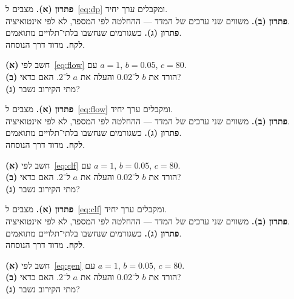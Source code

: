 \begin{keybox}[frametitle={פתרון 12},nobreak=true]
\textbf{פתרון (א).} מצבים ל~\eqref{eq:dp} ומקבלים ערך יחיד.\\[2pt]
\textbf{פתרון (ב).} משווים שני ערכים של המדד — ההחלטה לפי המספר, לא לפי אינטואיציה.\\[2pt]
\textbf{פתרון (ג).} כשגורמים שנחשבו בלתי־תלויים מתואמים.\\[2pt]
\textbf{לקח.} מדוד דרך הנוסחה.
\end{keybox}


\begin{exbox}[frametitle={תרגיל 13 — \en{maxflow}}]
\textbf{(א)} חשב לפי~\eqref{eq:flow} עם $a=1$, $b=0.05$, $c=80$.\\[3pt]
\textbf{(ב)} הורד את $b$ ל־$0.02$ והעלה את $a$ ל־$2$. האם כדאי?\\[3pt]
\textbf{(ג)} מתי הקירוב נשבר?
\end{exbox}

\begin{keybox}[frametitle={פתרון 13},nobreak=true]
\textbf{פתרון (א).} מצבים ל~\eqref{eq:flow} ומקבלים ערך יחיד.\\[2pt]
\textbf{פתרון (ב).} משווים שני ערכים של המדד — ההחלטה לפי המספר, לא לפי אינטואיציה.\\[2pt]
\textbf{פתרון (ג).} כשגורמים שנחשבו בלתי־תלויים מתואמים.\\[2pt]
\textbf{לקח.} מדוד דרך הנוסחה.
\end{keybox}


\begin{exbox}[frametitle={תרגיל 14 — \en{logistic}}]
\textbf{(א)} חשב לפי~\eqref{eq:clf} עם $a=1$, $b=0.05$, $c=80$.\\[3pt]
\textbf{(ב)} הורד את $b$ ל־$0.02$ והעלה את $a$ ל־$2$. האם כדאי?\\[3pt]
\textbf{(ג)} מתי הקירוב נשבר?
\end{exbox}

\begin{keybox}[frametitle={פתרון 14},nobreak=true]
\textbf{פתרון (א).} מצבים ל~\eqref{eq:clf} ומקבלים ערך יחיד.\\[2pt]
\textbf{פתרון (ב).} משווים שני ערכים של המדד — ההחלטה לפי המספר, לא לפי אינטואיציה.\\[2pt]
\textbf{פתרון (ג).} כשגורמים שנחשבו בלתי־תלויים מתואמים.\\[2pt]
\textbf{לקח.} מדוד דרך הנוסחה.
\end{keybox}


\begin{exbox}[frametitle={תרגיל 15 — \en{VC}}]
\textbf{(א)} חשב לפי~\eqref{eq:gen} עם $a=1$, $b=0.05$, $c=80$.\\[3pt]
\textbf{(ב)} הורד את $b$ ל־$0.02$ והעלה את $a$ ל־$2$. האם כדאי?\\[3pt]
\textbf{(ג)} מתי הקירוב נשבר?
\end{exbox}

